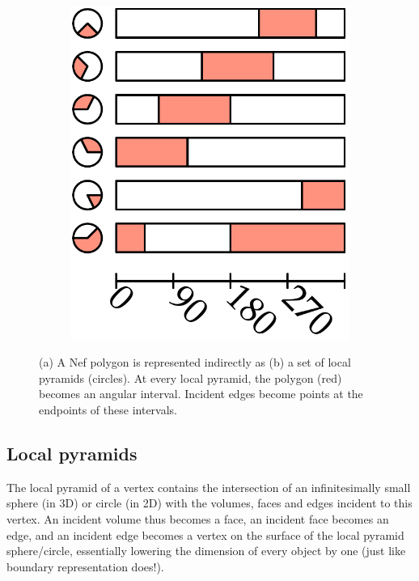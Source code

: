\begin{figure}
\begin{subfigure}[b]{0.35\linewidth}
\includegraphics[width=\linewidth]{figs/nef-2}
\caption{}%
\end{subfigure}
\caption{(a) A Nef polygon is represented indirectly as (b) a set of local pyramids (circles).
At every local pyramid, the polygon (red) becomes an angular interval.
Incident edges become points at the endpoints of these intervals.}%
\label{fig:nef}
\end{figure}

\subsection{Local pyramids}

The local pyramid of a vertex contains the intersection of an infinitesimally small sphere (in 3D) or circle (in 2D) with the volumes, faces and edges incident to this vertex.
An incident volume thus becomes a face, an incident face becomes an edge, and an incident edge becomes a vertex on the surface of the local pyramid sphere/circle, essentially lowering the dimension of every object by one (just like boundary representation does!).

